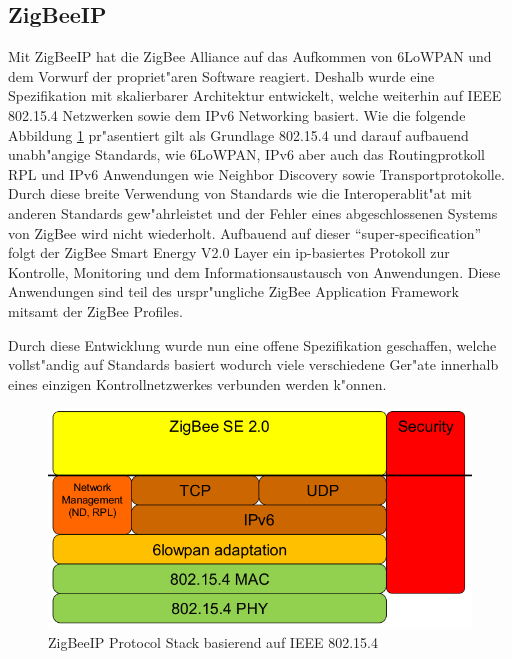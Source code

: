 \documentclass[final]{lktseminar}
\begin{document}
\subsection{ZigBeeIP}
\label{sec: ZigBeeIP}

Mit ZigBeeIP hat die ZigBee Alliance auf das Aufkommen von 6LoWPAN und dem Vorwurf der propriet"aren Software
reagiert. Deshalb wurde eine Spezifikation mit skalierbarer Architektur entwickelt, welche weiterhin auf IEEE
802.15.4 Netzwerken sowie dem IPv6 Networking basiert. Wie die folgende Abbildung \ref{fig:zigbeeip} pr"asentiert
gilt als Grundlage 802.15.4 und darauf aufbauend unabh"angige Standards, wie 6LoWPAN, IPv6 aber auch
 das Routingprotkoll RPL und IPv6 Anwendungen wie Neighbor Discovery sowie Transportprotokolle.
 Durch diese breite Verwendung von Standards wie die Interoperablit"at mit anderen Standards gew"ahrleistet
 und der Fehler eines abgeschlossenen Systems von ZigBee wird nicht wiederholt.
 Aufbauend auf dieser ``super-specification'' \cite{zigbeeip} folgt der ZigBee Smart Energy V2.0 Layer
 ein ip-basiertes Protokoll zur Kontrolle, Monitoring und dem Informationsaustausch von
 Anwendungen. Diese Anwendungen sind teil des urspr"ungliche ZigBee Application Framework
 mitsamt der ZigBee Profiles.

 Durch diese Entwicklung wurde nun eine offene Spezifikation geschaffen, welche vollst"andig auf Standards basiert
 wodurch viele verschiedene Ger"ate innerhalb eines einzigen Kontrollnetzwerkes verbunden werden k"onnen.

\begin{figure}[h]
    \centering
    \includegraphics[scale=0.5]{zigbeeip_stack.png}
    \caption{ZigBeeIP Protocol Stack basierend auf IEEE 802.15.4 \cite{zigbeeip}}
    \label{fig:zigbeeip}
\end{figure}

\end{document}
